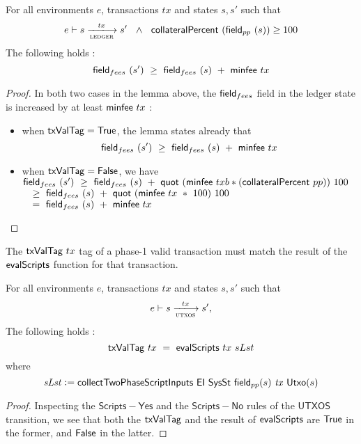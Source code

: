 \begin{property}
\begin{corollary}
  For all environments $e$, transactions $tx$ and states $s, s'$ such that
  \begin{equation*}
    e\vdash s\trans{ledger}{tx}s'~~\wedge~~\fun{collateralPercent}~(\field_{pp}~(s)) \geq 100
  \end{equation*}
  The following holds :
  \[\mathsf{field}_{fees}~(s')~\geq~\mathsf{field}_{fees}~(s)~+~\mathsf{minfee}~{tx} \]
\end{corollary}

\begin{proof}
  In both two cases in the lemma above, the $\mathsf{field}_{fees}$ field in the ledger state
  is increased by at least $\mathsf{minfee}~{tx}$ :
  \begin{itemize}
    \item when $\mathsf{txValTag} = \mathsf{True}$, the lemma states already that
    \[\mathsf{field}_{fees}~(s')~\geq~\mathsf{field}_{fees}~(s)~+~\mathsf{minfee}~{tx}\]
    \item when $\mathsf{txValTag} = \mathsf{False}$, we have
    $ \mathsf{field}_{fees}~(s')~\geq~\mathsf{field}_{fees}~(s)~+~\mathsf{quot}~(\mathsf{minfee}~{txb} * (\mathsf{collateralPercent}~pp))~100$ \\
    $~~~\geq~\mathsf{field}_{fees}~(s)~+~\mathsf{quot}~(\mathsf{minfee}~{tx}~*~100)~100$ \\
    $~~~=~\mathsf{field}_{fees}~(s)~+~\mathsf{minfee}~{tx}$
  \end{itemize}
\end{proof}

\end{property}

\begin{property}
  \label{prop:correct-tag}

The $\mathsf{txValTag}~tx$ tag of a phase-1 valid transaction must match the result of the $\mathsf{evalScripts}$
function for that transaction.

\begin{lemma}
  For all environments $e$, transactions $tx$ and states $s, s'$ such that
  \begin{equation*}
    e\vdash s\trans{utxos}{tx}s',
  \end{equation*}
  The following holds :
    \[\mathsf{txValTag}~tx ~=~ \mathsf{evalScripts}~{tx}~{sLst} \]
  where
  \[ \mathit{sLst} \mathrel{\mathop:}= \mathsf{collectTwoPhaseScriptInputs}~\mathsf{EI}~\mathsf{SysSt} ~\mathsf{field}_{pp}(s)~\mathit{tx}~ \mathsf{Utxo}(s) \]
\end{lemma}
\begin{proof}
  Inspecting the $\mathsf{Scripts{-}Yes}$ and the $\mathsf{Scripts{-}No}$ rules of the $\mathsf{UTXOS}$ transition,
  we see that both the $\mathsf{txValTag}$ and the result of $\mathsf{evalScripts}$
  are $\mathsf{True}$ in the former, and $\mathsf{False}$ in the latter.
\end{proof}
\end{property}

